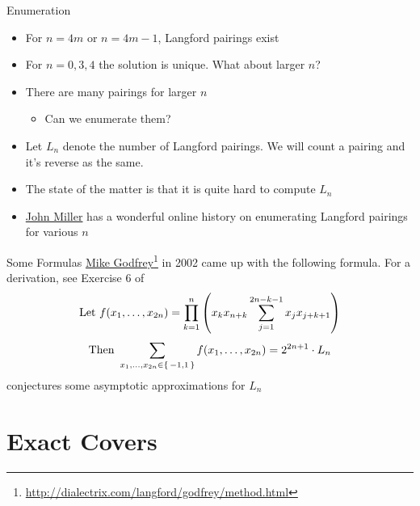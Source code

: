\documentclass[aspectratio=169]{beamer}
\begin{document}
\begin{frame}{Enumeration}
    \begin{itemize}
        \item For $n = 4m$ or $n = 4m - 1$, Langford pairings exist
        \item For $n = 0, 3, 4$ the solution is unique. What about larger $n$? \pause
        \item There are many pairings for larger $n$
        \begin{itemize}
            \item Can we \textcolor{sigma@mainblue}{enumerate} them?
        \end{itemize} \pause
        \item Let $L_n$ denote the number of Langford pairings. We will count a pairing and it's reverse as the same. 
        \item The state of the matter is that it is quite hard to compute $L_n$ \pause
                \item \href{http://dialectrix.com/langford.html}{\textcolor{sigma@mainblue}{John Miller}} has a wonderful online history on enumerating Langford pairings for various $n$
    \end{itemize}
\end{frame}

\begin{frame}{Some Formulas}
    \href{http://dialectrix.com/langford/godfrey/method.html}{\textcolor{sigma@mainblue}{Mike Godfrey}}\footnote{\href{http://dialectrix.com/langford/godfrey/method.html}{\textcolor{sigma@mainblue}{http://dialectrix.com/langford/godfrey/method.html}}} in 2002 came up with the following formula. For a derivation, see \textcolor{sigma@alertred}{Exercise 6 of \cite[Chapter~7]{TAOCP4A}}\pause
    \begin{equation*}
        \text{Let } f(x_1, \ldots, x_{2n}) = \prod_{k = 1}^n \pqty{x_k x_{n + k} \sum_{j = 1}^{2n - k - 1} x_j x_{j + k + 1}}
    \end{equation*}
    \begin{equation*}
        \text{Then } \sum_{x_1, \ldots, x_{2n} \in \set{-1, 1}} f(x_1, \ldots, x_{2n}) = 2^{2n + 1} \cdot L_n
    \end{equation*}\pause
    \cite{LangfordAsymptotic} conjectures some asymptotic approximations for $L_n$
\end{frame}

\section{Exact Covers}
\frame{\sectionpage}
\end{document}
